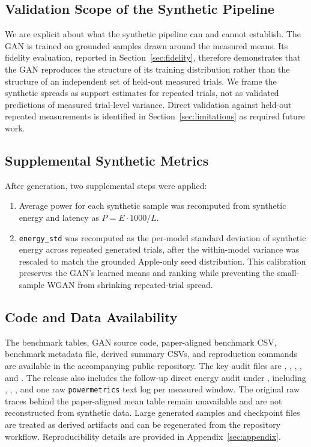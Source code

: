 \documentclass[conference]{IEEEtran}
\begin{document}
\subsection{Validation Scope of the Synthetic Pipeline}
We are explicit about what the synthetic pipeline can and cannot establish.
The GAN is trained on grounded samples drawn around the measured means. Its
fidelity evaluation, reported in Section~\ref{sec:fidelity}, therefore
demonstrates that the GAN reproduces the structure of its training
distribution rather than the structure of an independent set of held-out
measured trials. We frame the synthetic spreads as support estimates for
repeated trials, not as validated predictions of measured trial-level
variance. Direct validation against held-out repeated measurements is
identified in Section~\ref{sec:limitations} as required future work.

\subsection{Supplemental Synthetic Metrics}
After generation, two supplemental steps were applied:
\begin{enumerate}
\item Average power for each synthetic sample was recomputed from synthetic
energy and latency as $P = E \cdot 1000 / L$.
\item \texttt{energy\_std} was recomputed as the per-model standard deviation
of synthetic energy across repeated generated trials, after the within-model
variance was rescaled to match the grounded Apple-only seed distribution. This
calibration preserves the GAN's learned means and ranking while preventing the
small-sample WGAN from shrinking repeated-trial spread.
\end{enumerate}

\subsection{Code and Data Availability}
The benchmark tables, GAN source code, paper-aligned benchmark CSV, benchmark
metadata file, derived summary CSVs, and reproduction commands are available
in the accompanying public repository. The key audit files are
,
,
,
, and
. The release also includes the follow-up
direct energy audit under , including
,
,
, and one raw
\texttt{powermetrics} text log per measured window. The original raw traces
behind the paper-aligned mean table remain unavailable and are not
reconstructed from synthetic data. Large generated samples and checkpoint
files are treated as derived artifacts and can be regenerated from the
repository workflow.
Reproducibility details are provided in Appendix~\ref{sec:appendix}.
\end{document}
